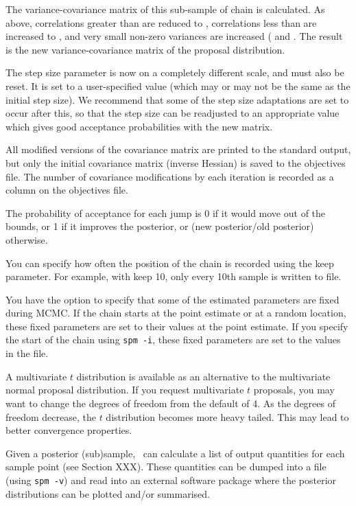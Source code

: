 The variance-covariance matrix of this sub-sample of chain is calculated. As above, correlations greater than  are reduced to , correlations less than  are increased to  , and very small non-zero variances are increased ( and . The result is the new variance-covariance matrix of the proposal distribution.

The step size parameter is now on a completely different scale, and must also be reset. It is set to a user-specified value (which may or may not be the same as the initial step size). We recommend that some of the step size adaptations are set to occur after this, so that the step size can be readjusted to an appropriate value which gives good acceptance probabilities with the new matrix. 

All modified versions of the covariance matrix are printed to the standard output, but only the initial covariance matrix (inverse Hessian) is saved to the objectives file. The number of covariance modifications by each iteration is recorded as a column on the objectives file. 

The probability of acceptance for each jump is 0 if it would move out of the bounds, or 1 if it improves the posterior, or (new posterior/old posterior) otherwise. 

You can specify how often the position of the chain is recorded using the keep parameter. For example, with keep 10, only every 10th sample is written to file. 

You have the option to specify that some of the estimated parameters are fixed during MCMC. If the chain starts at the point estimate or at a random location, these fixed parameters are set to their values at the point estimate. If you specify the start of the chain using \texttt{spm -i}, these fixed parameters are set to the values in the file.

A multivariate $t$ distribution is available as an alternative to the multivariate normal proposal distribution. If you request multivariate $t$ proposals, you may want to change the degrees of freedom from the default of 4. As the degrees of freedom decrease, the $t$ distribution becomes more heavy tailed. This may lead to better convergence properties.

Given a posterior (sub)sample, \SPM\ can calculate a list of output quantities for each sample point (see Section XXX). These quantities can be dumped into a file (using \texttt{spm -v}) and read into an external software package where the posterior distributions can be plotted and/or summarised. 

